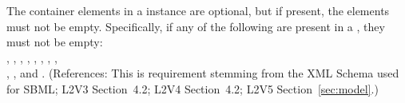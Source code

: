 The  container elements in a \Model instance are optional,
but if present, the elements must not be empty.  Specifically, if
any of the following are present in a \Model, they must not be empty:\\
,
,
,
,
, 
,
,
,\\
,
,
 and .  (References:
This is requirement stemming from the XML Schema used for SBML;
L2V3 Section~4.2; L2V4 Section~4.2; L2V5 Section~\ref{sec:model}.)
